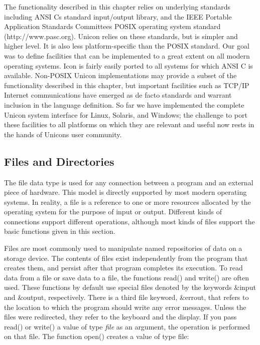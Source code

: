 The functionality described in this chapter relies on underlying
standards including ANSI C{\textquotesingle}s standard input/output
library, and the IEEE Portable Application Standards
Committee{\textquotesingle}s POSIX operating system
standard (http://www.pasc.org). Unicon relies on these standards, but
is simpler and higher level. It is also less platform-specific than the
POSIX standard. Our goal was to define facilities that can be
implemented to a great extent on all modern operating systems. Icon is
fairly easily ported to all systems for which ANSI C is available.
Non-POSIX Unicon implementations may provide a subset of the
functionality described in this chapter, but important facilities such
as TCP/IP Internet communications have emerged as de facto standards
and warrant inclusion in the language definition. So far we have
implemented the complete Unicon system interface for Linux, Solaris,
and Windows; the challenge to port these facilities to all platforms on
which they are relevant and useful now rests in the hands of
Unicon{\textquotesingle}s user community.

\subsection{Files and Directories}

The file data type is used for any connection between a program and an
external piece of hardware. This model is directly supported by most
modern operating systems. In reality, a file is a
reference to one or more resources allocated by
the operating system for the purpose of input or output. Different
kinds of connections support different operations, although most kinds
of files support the basic functions given in this section.

Files are most commonly used to manipulate named repositories of data on
a storage device. The contents of files exist independently from the
program that creates them, and persist after that program completes its
execution. To read data from a file or save data to a file, the
functions \textsf{read()} and
\textsf{write()} are often used. These functions by
default use special files denoted by the keywords \textsf{\&input} and \textsf{\&output}, respectively. There is a third file
keyword, \textsf{\&errout}, that refers
to the location to which the program should write any error messages.
Unless the files were redirected, they refer to the
keyboard and the display. If you pass
\textsf{read()} or \textsf{write()} a value of type \textit{file} as an
argument, the operation is performed on that file. The function
\textsf{open()}\textsf{ }creates a value of type file:

